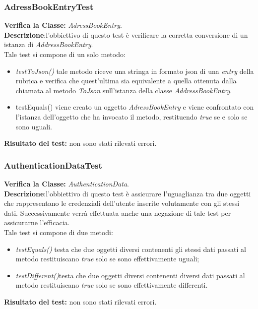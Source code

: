 \begin{table}
\end{table}

\subsubsection{AdressBookEntryTest}
\textbf{Verifica la Classe:} \textit{AdressBookEntry}.\\
\textbf{Descrizione}:l'obbiettivo di questo test è verificare la corretta conversione di un istanza di \textit{AddressBookEntry}.\\
Tale test si compone di un solo metodo:
\begin{itemize}
\item \textit{testToJson() } tale metodo riceve una stringa in formato json di una 	\textit{entry} della rubrica e verifica che quest'ultima sia equivalente a quella ottenuta dalla chiamata al metodo \textit{ToJson} sull'istanza della classe \textit{AddressBookEntry}.
\item{testEquals()} viene creato un oggetto \textit{AdressBookEntry} e viene confrontato con l'istanza dell'oggetto che ha invocato il metodo, restituendo \textit{true} se e solo se sono uguali.
\end{itemize}
\textbf{Risultato del test:} non sono stati rilevati errori.

\subsubsection{AuthenticationDataTest}
\textbf{Verifica la Classe:} \textit{AuthenticationData}.\\
\textbf{Descrizione}:l'obbiettivo di questo test è assicurare l'uguaglianza tra due oggetti che rappresentano le credenziali dell'utente inserite volutamente con gli stessi dati. Successivamente verrà effettuata anche una negazione di tale test per assicurarne l'efficacia.\\
Tale test si compone di due metodi:
\begin{itemize}
\item \textit{testEquals() } testa che due oggetti diversi contenenti gli stessi dati passati al metodo restituiscano \textit{true} solo se sono effettivamente uguali;
\item \textit{testDifferent()}testa che due oggetti diversi contenenti diversi dati passati al metodo restituiscano \textit{true} solo se sono effettivamente differenti.
\end{itemize}
\textbf{Risultato del test:} non sono stati rilevati errori.


